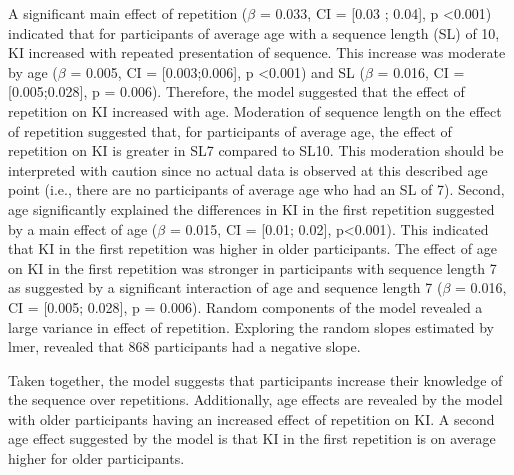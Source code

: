 A significant main effect of repetition ($\beta$  = 0.033, CI = [0.03 ; 0.04], p <0.001) indicated that for participants of average age with a sequence length (SL) of 10, KI increased with repeated presentation of sequence. This increase was moderate by age ($\beta$  = 0.005, CI = [0.003;0.006], p <0.001) and SL ($\beta$  = 0.016, CI = [0.005;0.028], p = 0.006). Therefore, the model suggested that the effect of repetition on KI increased with age. Moderation of sequence length on the effect of repetition suggested that, for participants of average age, the effect of repetition on KI is greater in SL7 compared to SL10. This moderation should be interpreted with caution since no actual data is observed at this described age point (i.e., there are no participants of average age who had an SL of 7). Second, age significantly explained the differences in KI in the first repetition suggested by a main effect of age ($\beta$  = 0.015, CI = [0.01; 0.02], p<0.001). This indicated that KI in the first repetition was higher in older participants. The effect of age on KI in the first repetition was stronger in participants with sequence length 7 as suggested by a significant interaction of age and sequence length 7 ($\beta$ = 0.016, CI =  [0.005; 0.028], p = 0.006). Random components of the model revealed a large variance in effect of repetition. Exploring the random slopes estimated by lmer, revealed that 868 participants had a negative slope.  

Taken together, the model suggests that participants increase their knowledge of the sequence over repetitions. Additionally, age effects are revealed by the model with older participants having an increased effect of repetition on KI. A second age effect suggested by the model is that KI in the first repetition is on average higher for older participants. 


